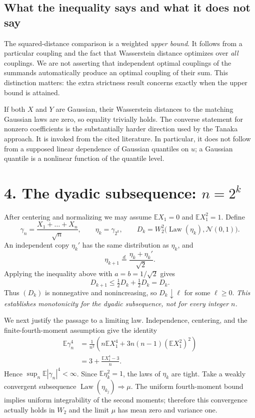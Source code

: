 \documentclass[10pt,a4paper]{article}
\newcommand{\Law}{\operatorname{Law}}
\newcommand{\E}{\mathbb E}
\newcommand{\N}{\mathcal N}
\newcommand{\W}{W_2}
\begin{document}
\subsection*{What the inequality says and what it does not say}
The squared-distance comparison is a weighted \emph{upper bound}. It follows from a particular coupling and the fact that Wasserstein distance optimizes over \emph{all} couplings. We are not asserting that independent optimal couplings of the summands automatically produce an optimal coupling of their sum. This distinction matters: the extra strictness result concerns exactly when the upper bound is attained.

If both $X$ and $Y$ are Gaussian, their Wasserstein distances to the matching Gaussian laws are zero, so equality trivially holds. The converse statement for nonzero coefficients is the substantially harder direction used by the Tanaka approach. It is invoked from the cited literature. In particular, it does not follow from a supposed linear dependence of Gaussian quantiles on $u$; a Gaussian quantile is a nonlinear function of the quantile level.

\section*{4. The dyadic subsequence: $n=2^k$}
After centering and normalizing we may assume $\E X_1=0$ and $\E X_1^2=1$. Define
\[
\gamma_n=\frac{X_1+\dots+X_n}{\sqrt n},\qquad
\eta_k=\gamma_{2^k},\qquad
D_k=\W^2\bigl(\Law(\eta_k),\N(0,1)\bigr).
\]
An independent copy $\eta_k'$ has the same distribution as $\eta_k$, and
\[
\eta_{k+1}\stackrel{d}=\frac{\eta_k+\eta_k'}{\sqrt2}.
\]
Applying the inequality above with $a=b=1/\sqrt2$ gives
\[
D_{k+1}\le\tfrac12D_k+\tfrac12D_k=D_k.
\]
Thus $(D_k)$ is nonnegative and nonincreasing, so $D_k\downarrow\ell$ for some $\ell\ge0$. \emph{This establishes monotonicity for the dyadic subsequence, not for every integer $n$.}

We next justify the passage to a limiting law. Independence, centering, and the finite-fourth-moment assumption give the identity
\begin{align*}
\E\gamma_n^4
&=\frac1{n^2}\left(n\E X_1^4+3n(n-1)(\E X_1^2)^2\right)\\
&=3+\frac{\E X_1^4-3}{n}.
\end{align*}
Hence $\sup_n\E|\gamma_n|^4<\infty$. Since $\E\eta_k^2=1$, the laws of $\eta_k$ are tight. Take a weakly convergent subsequence $\Law(\eta_{k_j})\Rightarrow\mu$. The uniform fourth-moment bound implies uniform integrability of the second moments; therefore this convergence actually holds in $W_2$ and the limit $\mu$ has mean zero and variance one.
\end{document}

